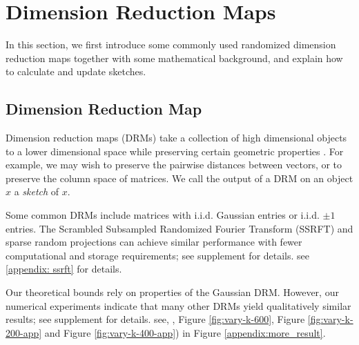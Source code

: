 \section{Dimension Reduction Maps}
In this section, we first introduce some commonly used
randomized dimension reduction maps together with some mathematical background,
and explain how to calculate and update sketches.

\subsection{Dimension Reduction Map} Dimension reduction maps (DRMs)
take a collection of high dimensional objects to a lower dimensional space
while preserving certain geometric properties \cite{oymak2015universality}.
For example, we may wish to preserve the pairwise distances between vectors,
or to preserve the column space of matrices.
We call the output of a DRM on an object $x$ a \emph{sketch} of $x$.

Some common DRMs include matrices with i.i.d. Gaussian entries
or i.i.d. $\pm 1$ entries.
The Scrambled Subsampled Randomized Fourier Transform (SSRFT) \cite{woolfe2008fast}
and sparse random projections \cite{achlioptas2003database, li2006very}
can achieve similar performance with fewer computational and storage requirements;
\ifdefined \issupplement
see supplement for details.
\else
see \ref{appendix: ssrft} for details.
\fi

Our theoretical bounds rely on properties of the Gaussian DRM.
However, our numerical experiments indicate that many other DRMs
yield qualitatively similar results;
\ifdefined \issupplement
see supplement for details.
\else
see, \eg, Figure \ref{fig:vary-k-600}, Figure \ref{fig:vary-k-200-app}
and Figure \ref{fig:vary-k-400-app})
in Figure \ref{appendix:more_result}.
\fi

